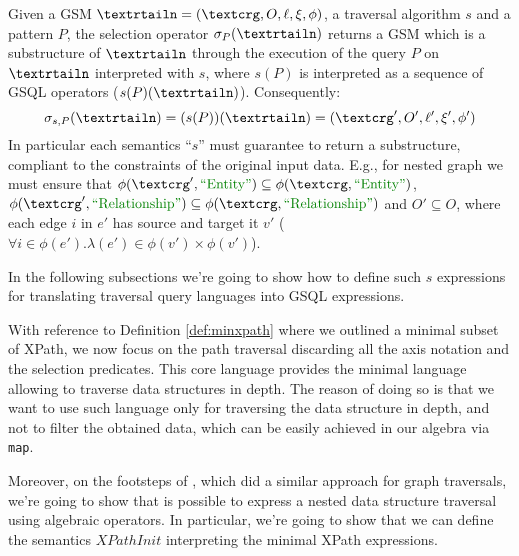 \begin{definition}[Selection]
	Given a GSM $\fullnested$, a traversal algorithm $s$ and a pattern  $P$, the selection operator $\sigma_P(\nested)$ returns a GSM which is a substructure of $\nested$ through the execution of the query $P$ on $\nested$ interpreted with $s$, where $s(P)$ is interpreted as a sequence of GSQL operators ($s(P)(\nested)$). Consequently:
	\[\sigma_{s,P}(\nested)=(s(P))(\nested)=(\ngraph',O',\ell',\xi',\phi')\]
	In particular each semantics ``$s$'' must guarantee to return a substructure, compliant to the constraints of the original input data. E.g., for nested graph we must ensure that
	$\phi(\ngraph',\ONTA)\subseteq \phi(\ngraph,\ONTA)$, $\phi(\ngraph',\RELA)\subseteq \phi(\ngraph,\RELA)$ and $O'\subseteq O$, where each edge $i$ in $e'$ has source and target it $v'$ ($\forall i\in\phi(e'). \lambda(e')\in\phi(v')\times \phi(v')$).
\end{definition}

In the following subsections we're going to show how to define such $s$ expressions for translating traversal query languages into GSQL expressions.

With reference to Definition \vref{def:minxpath} where we outlined a minimal subset of XPath, 
we now focus on the path traversal  discarding all the axis notation and the selection predicates. This core language provides the minimal language allowing to traverse data structures in depth.
The reason of doing so is that we want to use such language only for traversing the data structure in depth, and not to filter the obtained data, which can be easily achieved in our algebra via \texttt{map}. 

Moreover, on the footsteps of \cite{NautiLOD}, which did a similar approach for graph traversals, we're going to show that is possible to express a nested data structure traversal using algebraic operators. In particular, we're going to show that we can define the semantics $XPathInit$ interpreting the minimal XPath expressions.


